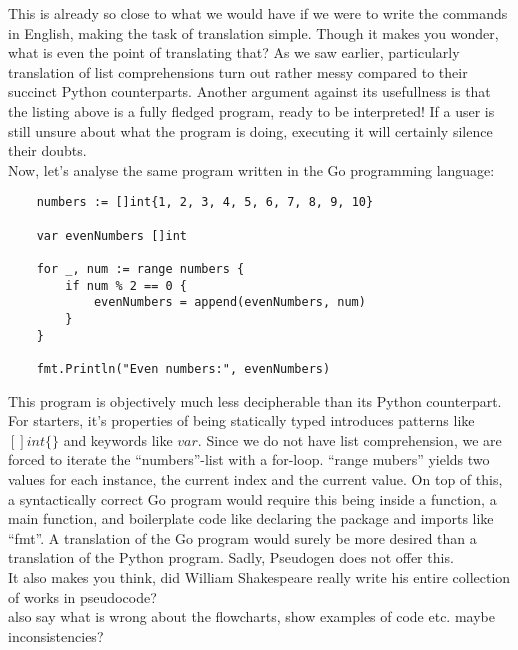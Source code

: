 This is already so close to what we would have if we were to write the commands in English, making the task of translation simple. Though it makes you wonder, what is even the point of translating that? As we saw earlier, particularly translation of list comprehensions turn out rather messy compared to their succinct Python counterparts. Another argument against its usefullness is that the listing above is a fully fledged program, ready to be interpreted! If a user is still unsure about what the program is doing, executing it will certainly silence their doubts. \hfill \\

Now, let's analyse the same program written in the Go programming language:

\begin{verbatim}
    numbers := []int{1, 2, 3, 4, 5, 6, 7, 8, 9, 10}

    var evenNumbers []int

    for _, num := range numbers {
        if num % 2 == 0 {
            evenNumbers = append(evenNumbers, num)
        }
    }

    fmt.Println("Even numbers:", evenNumbers)
\end{verbatim}

This program is objectively much less decipherable than its Python counterpart. For starters, it's properties of being statically typed introduces patterns like $[]int\{\}$ and keywords like $var$. Since we do not have list comprehension, we are forced to iterate the ``numbers''-list with a for-loop. ``range mubers'' yields two values for each instance, the current index and the current value. On top of this, a syntactically correct Go program would require this being inside a function, a main function, and boilerplate code like declaring the package and imports like ``fmt''. A translation of the Go program would surely be more desired than a translation of the Python program. Sadly, Pseudogen does not offer this. \hfill \\

It also makes you think, did William Shakespeare really write his entire collection of works in pseudocode? \hfill \\

also say what is wrong about the flowcharts, show examples of code etc. maybe inconsistencies?